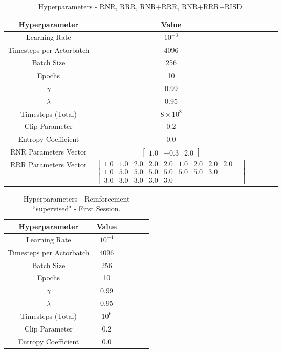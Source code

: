 
\begin{table}[!htbp]
	\caption{Hyperparameters - RNR, RRR, RNR+RRR, RNR+RRR+RISD.}
	\begin{center} 
		\begin{tabular}{|c|c|c|c|c|c|}
			\hline
			Hyperparameter & Value   \\
			\hline
			Learning Rate &    $10^{-3}$    \\
			Timesteps per Actorbatch & 4096    \\
			Batch Size &   256     \\
			Epochs &  10\\
			$\gamma$ & 0.99 \\
			$\lambda$ & 0.95 \\
			Timesteps (Total) & $8 \times 10^{8}$ \\
			Clip Parameter & 0.2\\
			Entropy Coefficient & 0.0 \\
			RNR Parameters Vector  & $\begin{bmatrix}
				1.0 & -0.3 & 2.0
			\end{bmatrix}$\\
			RRR Parameters Vector  & $\begin{bmatrix}
			1.0 & 1.0 & 2.0 & 2.0 & 2.0 & 1.0 & 2.0 & 2.0 & 2.0 & \\ 1.0 & 5.0 & 5.0 & 5.0 & 5.0 & 5.0 & 5.0 & 3.0 &\\ 3.0 & 3.0 & 3.0 & 3.0 & 3.0 
			\end{bmatrix}$\\
			\hline
		\end{tabular}
	
		\label{tab:finaltest}
	\end{center}
\end{table}


\begin{table}[!htbp]
	\caption{Hyperparameters - Reinforcement ``supervised" - First Session.}
	\begin{center} 
		\begin{tabular}{|c|c|c|c|c|c|}
			\hline
			Hyperparameter & Value   \\
			\hline
			Learning Rate &    $10^{-4}$    \\
			Timesteps per Actorbatch & 4096    \\
			Batch Size &   256     \\
			Epochs &  10\\
			$\gamma$ & 0.99 \\
			$\lambda$ & 0.95 \\
			Timesteps (Total) & $10^{6}$ \\
			Clip Parameter & 0.2\\
			Entropy Coefficient & 0.0 \\
			\hline
		\end{tabular}
		
		\label{tab:finaltest}
	\end{center}
\end{table}

